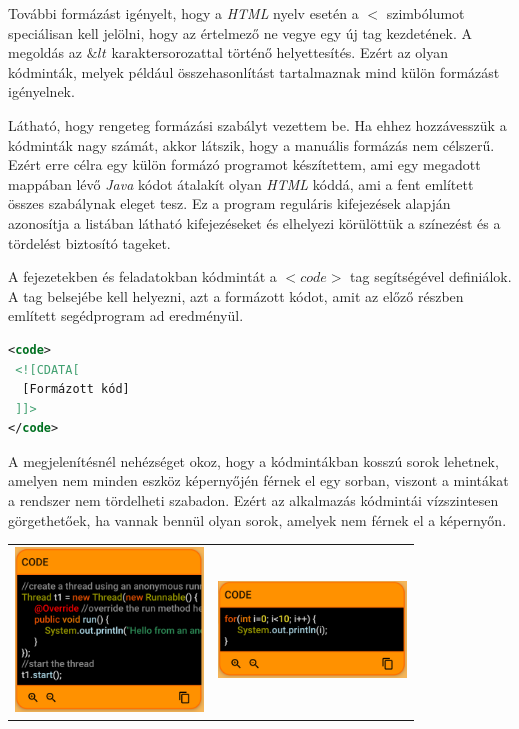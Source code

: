 \documentclass[12pt,a4paper]{article}
\begin{document}
	További formázást igényelt, hogy a \textit{HTML} nyelv esetén a $<$ szimbólumot speciálisan kell jelölni, hogy az értelmező ne vegye egy új tag kezdetének. A megoldás az $\&lt$ karaktersorozattal történő helyettesítés. Ezért az olyan kódminták, melyek például összehasonlítást tartalmaznak mind külön formázást igényelnek.
	
	Látható, hogy rengeteg formázási szabályt vezettem be. Ha ehhez hozzávesszük a kódminták nagy számát, akkor látszik, hogy a manuális formázás nem célszerű. Ezért erre  célra egy külön formázó programot készítettem, ami egy megadott mappában lévő \textit{Java} kódot átalakít olyan \textit{HTML} kóddá, ami a fent említett összes szabálynak eleget tesz. Ez a program reguláris kifejezések alapján azonosítja a listában látható kifejezéseket és elhelyezi körülöttük a színezést és a tördelést biztosító tageket.  
	
	A fejezetekben és feladatokban kódmintát a $<code>$ tag segítségével definiálok. A tag belsejébe kell helyezni, azt a formázott kódot, amit az előző részben említett segédprogram ad eredményül.
	
	\bigskip
	\begin{lstlisting}[language=XML]
<code>
 <![CDATA[
  [Formázott kód]
 ]]>
</code>	
	\end{lstlisting}
	\bigskip
	
	A megjelenítésnél nehézséget okoz, hogy a kódmintákban kosszú sorok lehetnek, amelyen nem minden eszköz képernyőjén férnek el egy sorban, viszont a mintákat a rendszer nem tördelheti szabadon. Ezért az alkalmazás kódmintái vízszintesen görgethetőek, ha vannak bennül olyan sorok, amelyek nem férnek el a képernyőn.
	
	\bigskip
	\begin{center}
		\begin{tabular}{c c}
			\includegraphics[width=5cm]{code_component_1}
			&
			\includegraphics[width=5cm]{code_component_2}
		\end{tabular}
	\end{center}
	\bigskip
	
\end{document}
